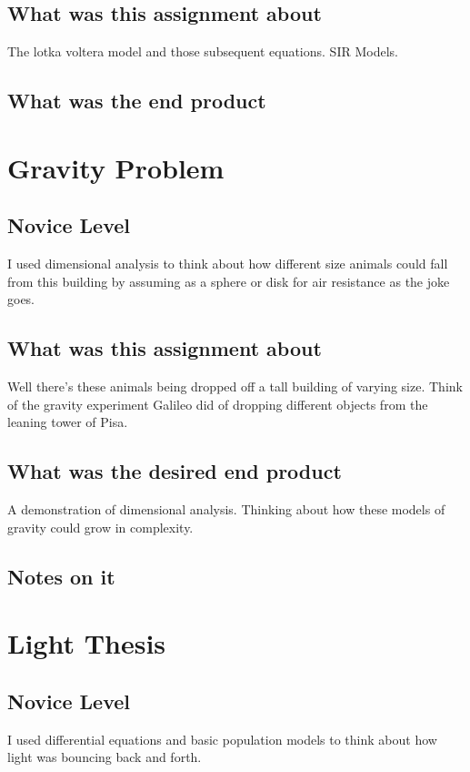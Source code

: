 \subsection{What was this assignment about}
The lotka voltera model and those subsequent equations. SIR Models. 

\subsection{What was the end product}




\section{Gravity Problem}


\subsection{Novice Level}
I used dimensional analysis to think about how different size animals could fall from this building by assuming as a sphere or disk for air resistance as the joke goes. 


\subsection{What was this assignment about}
Well there's these animals being dropped off a tall building of varying size. Think of the gravity experiment Galileo did of dropping different objects from the leaning tower of Pisa. \\ 

\subsection{What was the desired end product}
A demonstration of dimensional analysis. Thinking about how these models of gravity could grow in complexity. 

\subsection{Notes on it}




\section{Light Thesis}


\subsection{Novice Level}
I used differential equations and basic population models to think about how light was bouncing back and forth. 


